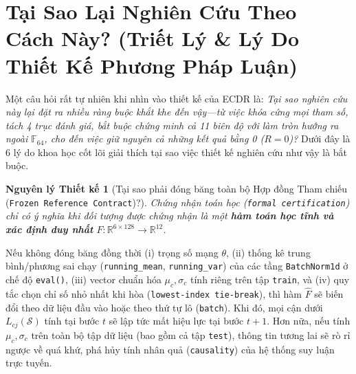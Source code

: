 \documentclass[11pt,a4paper]{article}
\newcommand{\R}{\mathbb{R}}
\newcommand{\F}{\mathbb{F}}
\newcommand{\code}[1]{{\small\ttfamily\nolinkurl{#1}}}
\newcommand{\Sset}{\mathcal{S}}
\newtheorem{principle}{Nguyên lý Thiết kế}[section]
\begin{document}
\section{Tại Sao Lại Nghiên Cứu Theo Cách Này? (Triết Lý \& Lý Do Thiết Kế Phương Pháp Luận)}

Một câu hỏi rất tự nhiên khi nhìn vào thiết kế của ECDR là: \textit{Tại sao nghiên cứu này lại đặt ra nhiều ràng buộc khắt khe đến vậy---từ việc khóa cứng mọi tham số, tách 4 trục đánh giá, bắt buộc chứng minh cả 11 biên độ với làm tròn hướng ra ngoài $\F_{64}$, cho đến việc giữ nguyên cả những kết quả bằng 0 ($R=0$)?} Dưới đây là 6 lý do khoa học cốt lõi giải thích tại sao việc thiết kế nghiên cứu như vậy là bắt buộc.

\begin{principle}[Tại sao phải đóng băng toàn bộ Hợp đồng Tham chiếu (\code{Frozen Reference Contract})?]
Chứng nhận toán học (\code{formal certification}) chỉ có ý nghĩa khi đối tượng được chứng nhận là một \textbf{hàm toán học tĩnh và xác định duy nhất} $\widehat{F}: \R^{6 \times 128} \to \R^{12}$.
\end{principle}
Nếu không đóng băng đồng thời (i) trọng số mạng $\theta$, (ii) thống kê trung bình/phương sai chạy (\code{running\_mean}, \code{running\_var}) của các tầng \code{BatchNorm1d} ở chế độ \code{eval()}, (iii) vector chuẩn hóa $\mu_c, \sigma_c$ tính riêng trên tập \code{train}, và (iv) quy tắc chọn chỉ số nhỏ nhất khi hòa (\code{lowest-index tie-break}), thì hàm $\widehat{F}$ sẽ biến đổi theo dữ liệu đầu vào hoặc theo thứ tự lô (\code{batch}). Khi đó, mọi cận dưới $L_{cj}(\Sset)$ tính tại bước $t$ sẽ lập tức mất hiệu lực tại bước $t+1$. Hơn nữa, nếu tính $\mu_c, \sigma_c$ trên toàn bộ tập dữ liệu (bao gồm cả tập \code{test}), thông tin tương lai sẽ rò rỉ ngược về quá khứ, phá hủy tính nhân quả (\code{causality}) của hệ thống suy luận trực tuyến.
\end{document}
